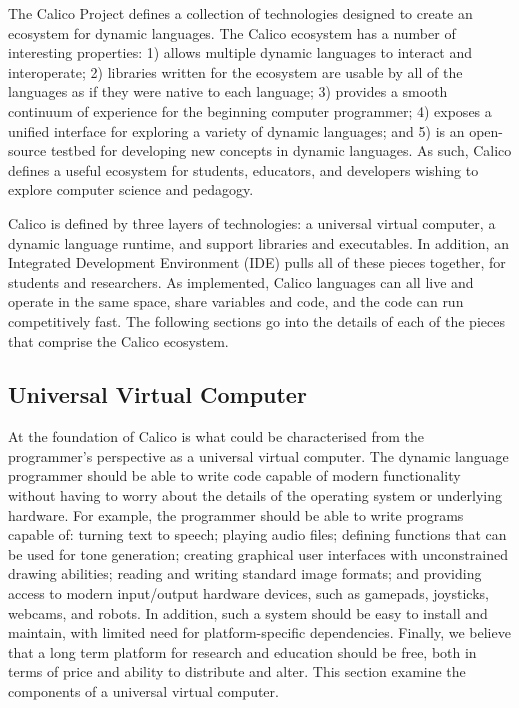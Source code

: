 \documentclass[preprint]{sigplanconf}
\begin{document}
The Calico Project defines a collection of technologies designed to
create an ecosystem for dynamic languages. The Calico ecosystem has a
number of interesting properties: 1) allows multiple dynamic languages
to interact and interoperate; 2) libraries written for the ecosystem
are usable by all of the languages as if they were native to each
language; 3) provides a smooth continuum of experience for the
beginning computer programmer; 4) exposes a unified interface for
exploring a variety of dynamic languages; and 5) is an open-source
testbed for developing new concepts in dynamic languages. As such,
Calico defines a useful ecosystem for students, educators, and
developers wishing to explore computer science and pedagogy.

Calico is defined by three layers of technologies: a universal virtual
computer, a dynamic language runtime, and support libraries and
executables. In addition, an Integrated Development Environment (IDE)
pulls all of these pieces together, for students and researchers. As
implemented, Calico languages can all live and operate in the same
space, share variables and code, and the code can run competitively
fast. The following sections go into the details of each of the pieces
that comprise the Calico ecosystem.

\subsection{Universal Virtual Computer}

At the foundation of Calico is what could be characterised from the
programmer's perspective as a universal virtual computer. The dynamic
language programmer should be able to write code capable of modern
functionality without having to worry about the details of the
operating system or underlying hardware. For example, the programmer
should be able to write programs capable of: turning text to speech;
playing audio files; defining functions that can be used for tone
generation; creating graphical user interfaces with unconstrained
drawing abilities; reading and writing standard image formats; and
providing access to modern input/output hardware devices, such as
gamepads, joysticks, webcams, and robots. In addition, such a system
should be easy to install and maintain, with limited need for
platform-specific dependencies. Finally, we believe that a long term
platform for research and education should be free, both in terms of
price and ability to distribute and alter. This section examine the
components of a universal virtual computer.
\end{document}
